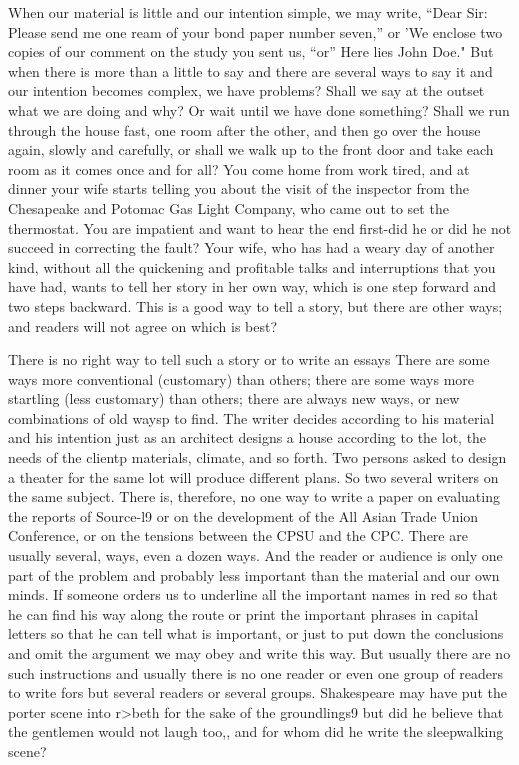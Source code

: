 \documentclass[
    oneside,
    11pt,
    draft
]{memoir}
\begin{document}
When our material is little and our intention simple, we may write, \enquote{Dear Sir: Please send me one ream of your bond paper number seven,} or 'We enclose two copies of our comment on the study you sent us, \enquote{or} Here lies John Doe." But when there is more than a little to say and there are several ways to say it and our intention becomes complex, we have problems? Shall we say at the outset what we are doing and why? Or wait until we have done something? Shall we run through the house fast, one room after the other, and then go over the house again, slowly and carefully, or shall we walk up to the front door and take each room as it comes once and for all? You come home from work tired, and at dinner your wife starts telling you about the visit of the inspector from the Chesapeake and Potomac Gas Light Company, who came out to set the thermostat. You are impatient and want to hear the end first-did he or did he not succeed in correcting the fault? Your wife, who has had a weary day of another kind, without all the quickening and profitable talks and interruptions that you have had, wants to tell her story in her own way, which is one step forward and two steps backward. This is a good way to tell a story, but there are other ways; and readers will not agree on which is best? 

There is no right way to tell such a story or to write an essays There are some ways more conventional (customary) than others; there are some ways more startling (less customary) than others; there are always new ways, or new combinations of old waysp to find. The writer decides according to his material and his intention just as an architect designs a house according to the lot, the needs of the clientp materials, climate, and so forth. Two persons asked to design a theater for the same lot will produce different plans. So two several writers on the same subject. There is, therefore, no one way to write a paper on evaluating the reports of Source-l9 or on the development of the All Asian Trade Union Conference, or on the tensions between the CPSU and the CPC. There are usually several, ways, even a dozen ways. And the reader or audience is only one part of the problem and probably less important than the material and our own minds. If someone orders us to underline all the important names in red so that he can find his way along the route or print the important phrases in capital letters so that he can tell what is important, or just to put down the conclusions and omit the argument we may obey and write this way. But usually there are no such instructions and usually there is no one reader or even one group of readers to write fors but several readers or several groups. Shakespeare may have put the porter scene into r>beth for the sake of the groundlings9 but did he believe that the gentlemen would not laugh too,, and for whom did he write the sleepwalking scene? 
\end{document}
